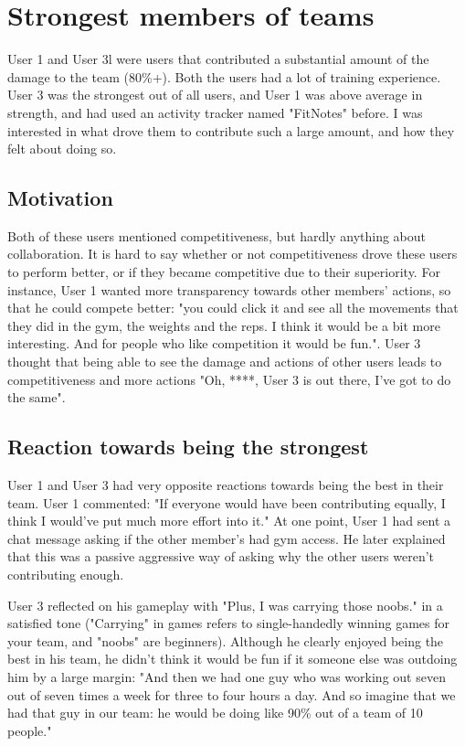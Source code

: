 \documentclass{l4proj}
\begin{document}
\section{Strongest members of teams}
User 1 and User 3l were users that contributed a substantial amount of the damage to the team (80\%+). Both the users had a lot of training experience. User 3 was the strongest out of all users, and User 1 was above average in strength, and had used an activity tracker named "FitNotes" before. I was interested in what drove them to contribute such a large amount, and how they felt about doing so. 

\subsection{Motivation}

Both of these users mentioned competitiveness, but hardly anything about collaboration. It is hard to say whether or not competitiveness drove these users to perform better, or if they became competitive due to their superiority. For instance, User 1 wanted more transparency towards other members' actions, so that he could compete better: "you could click it and see all the movements that they did in the gym, the weights and the reps. I think it would be a bit more interesting. And for people who like competition it would be fun.".  User 3 thought that being able to see the damage and actions of other users leads to competitiveness and more actions "Oh, ****, User 3 is out there, I've got to do the same". 

\subsection{Reaction towards being the strongest}

User 1 and User 3 had very opposite reactions towards being the best in their team. User 1 commented: "If everyone would have been contributing equally, I think I would've put much more effort into it." At one point, User 1 had sent a chat message asking if the other member's had gym access. He later explained that this was a passive aggressive way of asking why the other users weren't contributing enough. 

User 3 reflected on his gameplay with "Plus, I was carrying those noobs." in a satisfied tone ("Carrying" in games refers to single-handedly winning games for your team, and "noobs" are beginners). Although he clearly enjoyed being the best in his team, he didn't think it would be fun if it someone else was outdoing him by a large margin: "And then we had one guy who was working out seven out of seven times a week for three to four hours a day. And so imagine that we had that guy in our team: he would be doing like 90\% out of a team of 10 people." 
\end{document}
